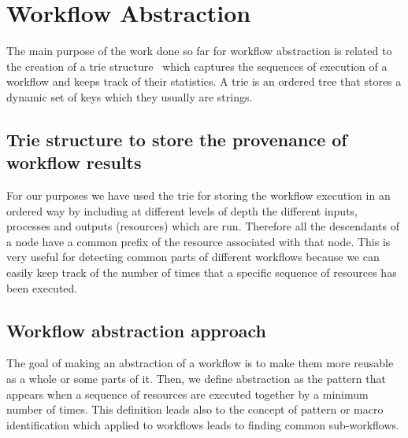 \section{Workflow Abstraction}

\label{sec:abstraction}
The main purpose of the work done so far for workflow abstraction is related to the creation of a trie structure~\cite{knuth11} which captures the sequences of execution of a workflow and keeps track of their statistics. A trie is an ordered tree that stores a dynamic set of keys which they usually are strings. 

\subsection{Trie structure to store the provenance of workflow results}
For our purposes we have used the trie for storing the workflow execution in an ordered way by including at different levels of depth the different inputs, processes and outputs (resources) which are run. Therefore all the descendants of a node have a common prefix of the resource associated with that node. This is very useful for detecting common parts of different workflows because we can easily keep track of the number of times that a specific sequence of resources has been executed. \\


\subsection{Workflow abstraction approach}
The goal of making an abstraction of a workflow is to make them more reusable as a whole or some parts of it. Then, we define abstraction as the pattern that appears when a sequence of resources are executed together by a minimum number of times. This definition leads also to the concept of pattern or macro identification which applied to workflows leads to finding common sub-workflows. \\ 

